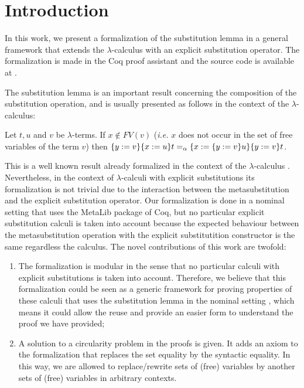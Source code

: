 \begin{coqdoccode}
\coqdocemptyline
\end{coqdoccode}
\section{Introduction}



 In this work, we present a formalization of the substitution lemma \cite{barendregtLambdaCalculusIts1984} in a general framework that extends the $\lambda$-calculus with an explicit substitution operator. The formalization is made in the Coq proof assistant \cite{teamCoqProofAssistant2021} and the source code is available at \cite{msubstlemma}.


The substitution lemma is an important result concerning the composition of the substitution operation, and is usually presented as follows in the context of the $\lambda$-calculus:


\begin{tcolorbox}
 Let $t,u$ and $v$ be $\lambda$-terms. If $x\notin FV(v)$ ({\it i.e.} $x$ does not occur in the set of free variables of the term $v$) then $\metasub{\metasub{t}{x}{u}}{y}{v} =_\alpha \metasub{\metasub{t}{y}{v}}{x}{\metasub{u}{y}{v}}$.
\end{tcolorbox}


This is a well known result already formalized in the context of the $\lambda$-calculus \cite{berghoferHeadtoHeadComparisonBruijn2007}. Nevertheless, in the context of $\lambda$-calculi with explicit substitutions its formalization is not trivial due to the interaction between the metasubstitution and the explicit substitution operator. Our formalization is done in a nominal setting that uses the MetaLib \cite{metalib} package of Coq, but no particular explicit substitution calculi is taken into account because the expected behaviour between the metasubstitution operation with the explicit substitutition constructor is the same regardless the calculus. The novel contributions of this work are twofold:


\begin{enumerate}
\item The formalization is modular in the sense that no particular calculi with explicit substitutions is taken into account. Therefore, we believe that this formalization could be seen as a generic framework for proving properties of these calculi that uses the substitution lemma in the nominal setting \cite{kesnerPerpetualityFullSafe2008,nakazawaCompositionalConfluenceProofs2016,nakazawaPropertyShufflingCalculus2023}, which means it could allow the reuse and provide an easier form to understand the proof we have provided;
\item A solution to a circularity problem in the proofs is given. It adds an axiom to the formalization that replaces the set equality by the syntactic equality. In this way, we are allowed to replace/rewrite sets of (free) variables by another sets of (free) variables in arbitrary contexts.
\end{enumerate}


